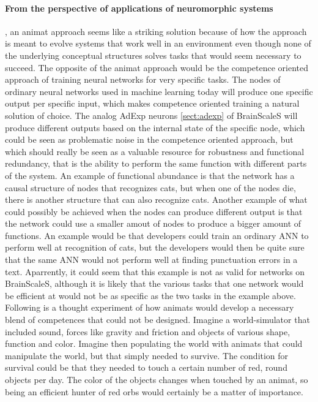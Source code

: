 \paragraph{From the perspective of applications of neuromorphic systems}, an animat approach seems like a striking solution because of how the approach is meant to evolve systems that work well in an environment even though none of the underlying conceptual structures solves tasks that would seem necessary to succeed.
The opposite of the animat approach would be the competence oriented approach of training neural networks for very specific tasks.
The nodes of ordinary neural networks used in machine learning today will produce one specific output per specific input, which makes competence oriented training a natural solution of choice.
The analog AdExp neurons \vref{sect:adexp} of BrainScaleS will produce different outputs based on the internal state of the specific node, which could be seen as problematic noise in the competence oriented approach, but which should really be seen as a valuable resource for robustness and functional redundancy, that is the ability to perform the same function with different parts of the system.
An example of functional abundance is that the network has a causal structure of nodes that recognizes cats, but when one of the nodes die, there is another structure that can also recognize cats.
Another example of what could possibly be achieved when the nodes can produce different output is that the network could use a smaller amout of nodes to produce a bigger amount of functions.
An example would be that developers could train an ordinary ANN to perform well at recognition of cats, but the developers would then be quite sure that the same ANN would not perform well at finding punctuation errors in a text.
Aparrently, it could seem that this example is not as valid for networks on BrainScaleS, although it is likely that the various tasks that one network would be efficient at would not be as specific as the two tasks in the example above.
Following is a thought experiment of how animats would develop a necessary blend of competences that could not be designed.
Imagine a world-simulator that included sound, forces like gravity and friction and objects of various shape, function and color.
Imagine then populating the world with animats that could manipulate the world, but that simply needed to survive.
The condition for survival could be that they needed to touch a certain number of red, round objects per day.
The color of the objects changes when touched by an animat, so being an efficient hunter of red orbs would certainly be a matter of importance.
